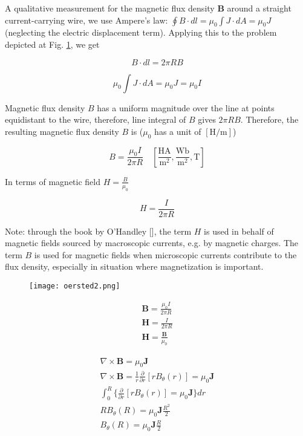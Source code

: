 A qualitative measurement for the magnetic flux density $\mathbf{B}$ around a straight current-carrying wire, we use Ampere's law: $\oint B \cdot dl = \mu_{0} \int J \cdot dA = \mu_{0}J$ (neglecting the electric displacement term). Applying this to the problem depicted at Fig. \ref{fig:strcurrentB}, we get

\begin{equation}
	B \cdot dl = 2 \pi R B
\end{equation}

\begin{equation}
	\mu_{0} \int J \cdot dA = \mu_{0}J = \mu_{0} I
\end{equation}

Magnetic flux density $B$ has a uniform magnitude over the line at points equidistant to the wire, therefore, line integral of $B$ gives $2 \pi R B$. Therefore, the resulting magnetic flux density $B$ is ($\mu_{0}$ has a unit of $[\mathrm{H/m}]$)

\begin{equation}
	B = \frac{\mu_{0} I}{2 \pi R} \quad [\mathrm{\frac{HA}{m^{2}}}, \mathrm{\frac{Wb}{m^{2}}}, \mathrm{T}]
\end{equation}

In terms of magnetic field $H = \frac{B}{\mu_{0}}$

\begin{equation}
	H = \frac{I}{2 \pi R}
\end{equation}

Note: through the book by O'Handley [\cite{ohandley_modern_2000}], the term $H$ is used in behalf of magnetic fields sourced by macroscopic currents, e.g. by magnetic charges. The term $B$ is used for magnetic fields when microscopic currents contribute to the flux density, especially in situation where magnetization is important.




\begin{figure}[h]
    \centering
    \texttt{[image: oersted2.png]}
    \label{fig:strcurrentB}
\end{figure}

\begin{eqnarray}
	\textbf{B} = \frac{\mu_{0} I}{2 \pi R} \\
	\textbf{H} = \frac{I}{2 \pi R} \\
	\textbf{H} = \frac{\textbf{B}}{\mu_{0}}
\end{eqnarray}

\begin{eqnarray}
	\nabla \times \textbf{B} = \mu_{0} \textbf{J} \\
	\nabla \times \textbf{B} = \frac{1}{r} \frac{\partial}{\partial r} [r B_{\theta}(r)] = \mu_{0} \textbf{J} \\
	\int_{0}^{R} \{ \frac{\partial}{\partial r}[r B_{\theta}(r)] = \mu_{0} \textbf{J} \} dr \\
	R B_{\theta}(R) = \mu_{0} \textbf{J} \frac{R^{2}}{2} \\
	B_{\theta}(R) = \mu_{0} \textbf{J} \frac{R}{2}
\end{eqnarray}

